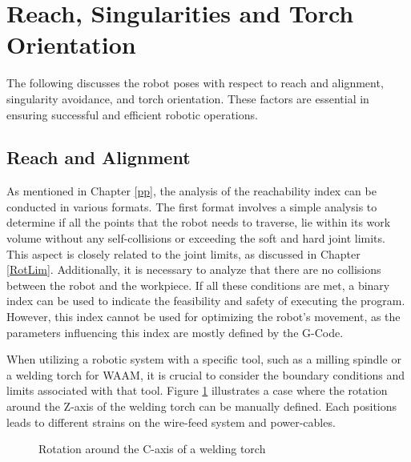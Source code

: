 \section{Reach, Singularities and Torch Orientation}
The following discusses the robot poses with respect to reach and alignment, singularity avoidance, and torch orientation. These factors are essential in ensuring successful and efficient robotic operations.

\subsection{Reach and Alignment}\label{RO}

As mentioned in Chapter \ref{pp}, the analysis of the reachability index can be conducted in various formats. The first format involves a simple analysis to determine if all the points that the robot needs to traverse, lie within its work volume without any self-collisions or exceeding the soft and hard joint limits. This aspect is closely related to the joint limits, as discussed in Chapter \ref{RotLim}. Additionally, it is necessary to analyze that there are no collisions between the robot and the workpiece. If all these conditions are met, a binary index can be used to indicate the feasibility and safety of executing the program. However, this index cannot be used for optimizing the robot's movement, as the parameters influencing this index are mostly defined by the G-Code.

When utilizing a robotic system with a specific tool, such as a milling spindle or a welding torch for \acrshort{WAAM}, it is crucial to consider the boundary conditions and limits associated with that tool. Figure \ref{rot} illustrates a case where the rotation around the Z-axis of the welding torch can be manually defined. Each positions leads to different strains on the wire-feed system and power-cables.

\begin{figure}[H]%
	\centering
	\qquad
	\caption{Rotation around the C-axis of a welding torch }%
	\label{rot}%
\end{figure}

